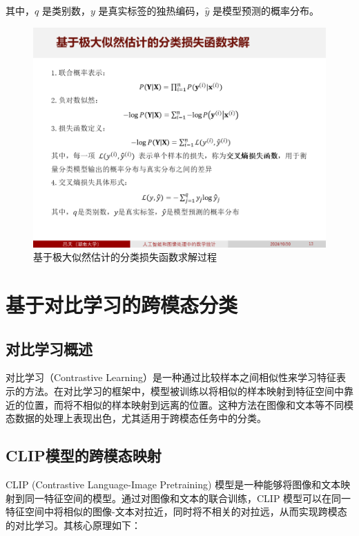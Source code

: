 \documentclass[
    report,     %
    oneside,    %
    UTF8,       %
    zihao=-4    %
]{config} %
\begin{document}
其中，\( q \) 是类别数，\( y \) 是真实标签的独热编码，\( \hat{y} \) 是模型预测的概率分布。

\begin{figure}[H]
    \centering
    \includegraphics[width=\linewidth]{figures/神经网络分类的原理与实现/3.PNG}
    \caption{基于极大似然估计的分类损失函数求解过程}
\end{figure}


\chapter{基于对比学习的跨模态分类}

\section{对比学习概述}

对比学习（Contrastive Learning）是一种通过比较样本之间相似性来学习特征表示的方法。在对比学习的框架中，模型被训练以将相似的样本映射到特征空间中靠近的位置，而将不相似的样本映射到远离的位置。这种方法在图像和文本等不同模态数据的处理上表现出色，尤其适用于跨模态任务中的分类。

\section{CLIP模型的跨模态映射}

CLIP\cite{clip} (Contrastive Language-Image Pretraining) 模型是一种能够将图像和文本映射到同一特征空间的模型。通过对图像和文本的联合训练，CLIP 模型可以在同一特征空间中将相似的图像-文本对拉近，同时将不相关的对拉远，从而实现跨模态的对比学习。其核心原理如下：
\end{document}
